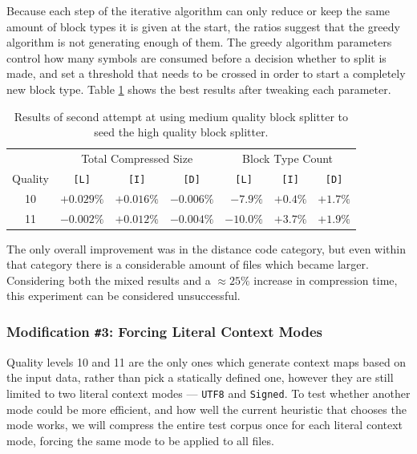 \documentclass[english,master,dept460,male,cpp,cpdeclaration]{diploma}
\begin{document}
		\noindent
		Because each step of the iterative algorithm can only reduce or keep the same amount of block types it is given at the start, the ratios suggest that the greedy algorithm is not generating enough of them. The greedy algorithm parameters control how many symbols are consumed before a decision whether to split is made, and set a threshold that needs to be crossed in order to start a completely new block type. Table \ref{table:experiment-seed-block-split-mix-2} shows the best results after tweaking each parameter.
		
		\begin{table}[H]
			\centering
			\caption{Results of second attempt at using medium quality block splitter to seed the high quality block splitter.}
			\label{table:experiment-seed-block-split-mix-2}
			
			\newcommand{\cat}[1]{\multicolumn{1}{c|}{\texttt{[#1]}}}
			\newcommand{\catl}[1]{\multicolumn{1}{c||}{\texttt{[#1]}}}
			
			\begin{tabular}{|c||r|r|r||r|r|r|}
				\hline
				        & \multicolumn{3}{c||}{Total Compressed Size} & \multicolumn{3}{c|}{Block Type Count} \\ \cline{2-7}
				Quality &     \cat{L} &     \cat{I} &        \catl{D} &    \cat{L} &   \cat{I} &      \cat{D} \\ \hline
				  10    & $+0.029 \%$ & $+0.016 \%$ &     $-0.006 \%$ &  $-7.9 \%$ & $+0.4 \%$ &    $+1.7 \%$ \\
				  11    & $-0.002 \%$ & $+0.012 \%$ &     $-0.004 \%$ & $-10.0 \%$ & $+3.7 \%$ &    $+1.9 \%$ \\ \hline
			\end{tabular}
		\end{table}
		
		\noindent
		The only overall improvement was in the distance code category, but even within that category there is a considerable amount of files which became larger. Considering both the mixed results and a $\approx 25 \%$ increase in compression time, this experiment can be considered unsuccessful.
		
		\subsubsection{Modification \texttt{\#}3: Forcing Literal Context Modes}
		
		Quality levels 10 and 11 are the only ones which generate context maps based on the input data, rather than pick a statically defined one, however they are still limited to two literal context modes --- \verb|UTF8| and \verb|Signed|. To test whether another mode could be more efficient, and how well the current heuristic that chooses the mode works, we will compress the entire test corpus once for each literal context mode, forcing the same mode to be applied to all files.
		
\end{document}
